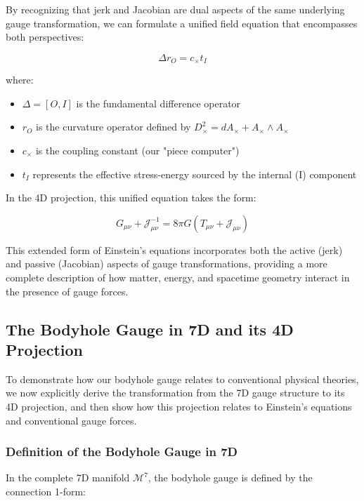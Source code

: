 \documentclass{article}
\begin{document}
By recognizing that jerk and Jacobian are dual aspects of the same underlying gauge transformation, we can formulate a unified field equation that encompasses both perspectives:

\begin{equation}
\Delta r_O = c_{\times} t_I
\end{equation}

where:
\begin{itemize}
\item $\Delta = [O, I]$ is the fundamental difference operator
\item $r_O$ is the curvature operator defined by $D_{\times}^2 = dA_{\times} + A_{\times} \wedge A_{\times}$
\item $c_{\times}$ is the coupling constant (our "piece computer")
\item $t_I$ represents the effective stress-energy sourced by the internal (I) component
\end{itemize}

In the 4D projection, this unified equation takes the form:

\begin{equation}
G_{\mu\nu} + \mathcal{J}^{-1}_{\mu\nu} = 8\pi G (T_{\mu\nu} + \mathcal{J}_{\mu\nu})
\end{equation}

This extended form of Einstein's equations incorporates both the active (jerk) and passive (Jacobian) aspects of gauge transformations, providing a more complete description of how matter, energy, and spacetime geometry interact in the presence of gauge forces.

\subsection{The Bodyhole Gauge in 7D and its 4D Projection}

To demonstrate how our bodyhole gauge relates to conventional physical theories, we now explicitly derive the transformation from the 7D gauge structure to its 4D projection, and then show how this projection relates to Einstein's equations and conventional gauge forces.

\subsubsection{Definition of the Bodyhole Gauge in 7D}

In the complete 7D manifold $\mathcal{M}^7$, the bodyhole gauge is defined by the connection 1-form:
\end{document}
